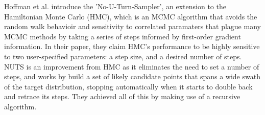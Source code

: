 Hoffman et al. introduce the 'No-U-Turn-Sampler', an extension to the Hamiltonian Monte Carlo (HMC), which is an MCMC algorithm that avoids the random walk behavioir and sensitivity to correlated paramaters that plague many MCMC methods by taking a series of steps informed by first-order gradient information.\cite{Matthew-D.-Hoffman:2014aa} In their paper, they claim HMC’s performance to be highly sensitive to two user-specified parameters: a step size, and a desired number of steps. NUTS is an improvement from HMC as it eliminates the need to set a number of steps, and works by build a set of likely candidate points that spans a wide swath of the target distribution, stopping automatically when it starts to double back and retrace its steps. They achieved all of this by making use of a recursive algorithm.
